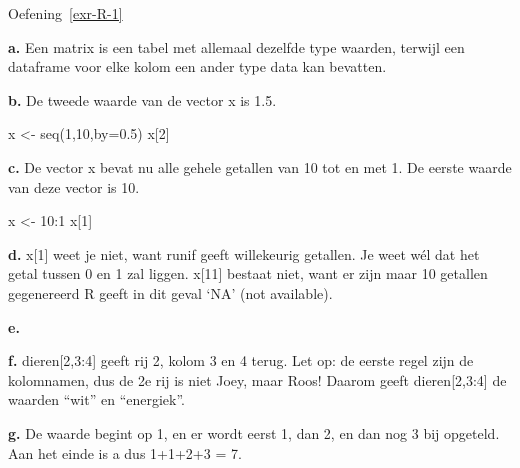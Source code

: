 \documentclass[
  a4paper,
]{scrbook}
\newenvironment{Shaded}{\begin{snugshade}}{\end{snugshade}}
\newcommand{\AttributeTok}[1]{\textcolor[rgb]{0.40,0.45,0.13}{#1}}
\newcommand{\DecValTok}[1]{\textcolor[rgb]{0.68,0.00,0.00}{#1}}
\newcommand{\FloatTok}[1]{\textcolor[rgb]{0.68,0.00,0.00}{#1}}
\newcommand{\FunctionTok}[1]{\textcolor[rgb]{0.28,0.35,0.67}{#1}}
\newcommand{\NormalTok}[1]{\textcolor[rgb]{0.00,0.23,0.31}{#1}}
\newcommand{\OtherTok}[1]{\textcolor[rgb]{0.00,0.23,0.31}{#1}}
\newcommand{\SpecialCharTok}[1]{\textcolor[rgb]{0.37,0.37,0.37}{#1}}
\theoremstyle{definition}
\theoremstyle{remark}
\begin{document}

Oefening~\ref{exr-R-1}

\textbf{a.} Een matrix is een tabel met allemaal dezelfde type waarden,
terwijl een dataframe voor elke kolom een ander type data kan bevatten.

\textbf{b.} De tweede waarde van de vector x is 1.5.

\begin{Shaded}
\begin{Highlighting}[]
\NormalTok{x }\OtherTok{\textless{}{-}} \FunctionTok{seq}\NormalTok{(}\DecValTok{1}\NormalTok{,}\DecValTok{10}\NormalTok{,}\AttributeTok{by=}\FloatTok{0.5}\NormalTok{)}
\NormalTok{x[}\DecValTok{2}\NormalTok{]}
\end{Highlighting}
\end{Shaded}

\textbf{c.} De vector x bevat nu alle gehele getallen van 10 tot en met
1. De eerste waarde van deze vector is 10.

\begin{Shaded}
\begin{Highlighting}[]
\NormalTok{x }\OtherTok{\textless{}{-}} \DecValTok{10}\SpecialCharTok{:}\DecValTok{1}
\NormalTok{x[}\DecValTok{1}\NormalTok{] }
\end{Highlighting}
\end{Shaded}

\textbf{d.} x{[}1{]} weet je niet, want runif geeft willekeurig
getallen. Je weet wél dat het getal tussen 0 en 1 zal liggen. x{[}11{]}
bestaat niet, want er zijn maar 10 getallen gegenereerd R geeft in dit
geval `NA' (not available).

\textbf{e.}

\begin{Shaded}
\end{Shaded}

\textbf{f.} dieren{[}2,3:4{]} geeft rij 2, kolom 3 en 4 terug. Let op:
de eerste regel zijn de kolomnamen, dus de 2e rij is niet Joey, maar
Roos! Daarom geeft dieren{[}2,3:4{]} de waarden ``wit'' en ``energiek''.

\textbf{g.} De waarde begint op 1, en er wordt eerst 1, dan 2, en dan
nog 3 bij opgeteld. Aan het einde is a dus 1+1+2+3 = 7.
\end{document}
